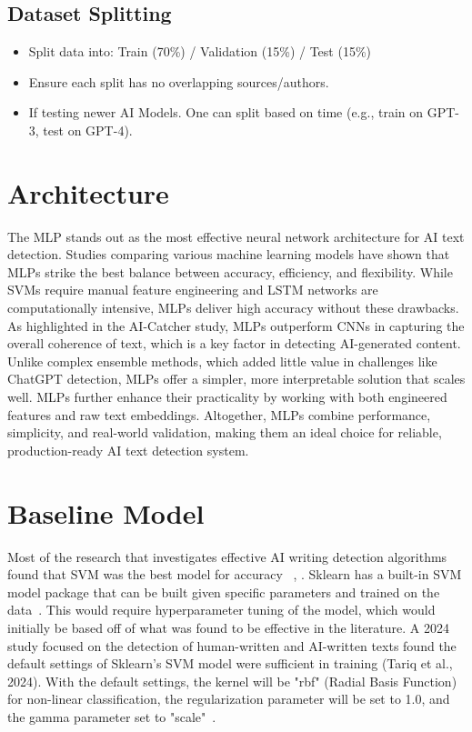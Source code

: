 \documentclass{article} %
\begin{document}
\subsection{Dataset Splitting}
\begin{itemize}
    \item Split data into: Train (70\%) / Validation (15\%) / Test (15\%)
    \item Ensure each split has no overlapping sources/authors.
    \item If testing newer AI Models. One can split based on time (e.g., train on GPT-3, test on GPT-4).
\end{itemize}

\section{Architecture}
The MLP stands out as the most effective neural network architecture for AI text detection. Studies comparing various machine learning models have shown that MLPs strike the best balance between accuracy, efficiency, and flexibility. While SVMs require manual feature engineering and LSTM networks are computationally intensive, MLPs deliver high accuracy without these drawbacks. As highlighted in the AI-Catcher study, MLPs outperform CNNs in capturing the overall coherence of text, which is a key factor in detecting AI-generated content. Unlike complex ensemble methods, which added little value in challenges like ChatGPT detection, MLPs offer a simpler, more interpretable solution that scales well. MLPs further enhance their practicality by working with both engineered features and raw text embeddings. Altogether, MLPs combine performance, simplicity, and real-world validation, making them an ideal choice for reliable, production-ready AI text detection system.

\section{Baseline Model}
Most of the research that investigates effective AI writing detection algorithms found that SVM was the best model for accuracy ~\citep{AIessays2023}, \citep{Approaches}.
Sklearn has a built-in SVM model package that can be built given specific parameters and trained on the data~\citep{GeeksForGeeks}. This would require hyperparameter tuning of the model, which would initially be based off of what was found to be effective in the literature. A 2024 study focused on the detection of human-written and AI-written texts found the default settings of Sklearn's SVM model were sufficient in training (Tariq et al., 2024). With the default settings, the kernel will be "rbf" (Radial Basis Function) for non-linear classification, the regularization parameter will be set to 1.0, and the gamma parameter set to "scale"~\citep{Approaches}.
\end{document}
